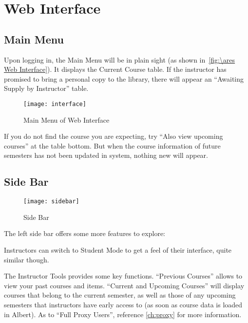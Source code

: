 \chapter{Web Interface}
\label{ch:interface}
\section{Main Menu}
\label{sec:main menu}
Upon logging in, the {\imp Main Menu} will be in plain sight (as shown in~\autoref{fig:\ares Web Interface}). It displays the Current Course table. If the instructor has promised to bring a personal copy to the library, there will appear an ``Awaiting Supply by Instructor'' table. 
\vspace*{3.5ex}

\begin{figure}[h]
    \centering
    \texttt{[image: interface]}
    \caption{Main Menu of \ares Web Interface}
    \label{fig:\ares Web Interface}
\end{figure}
\vspace*{2.5ex}

If you do not find the course you are expecting, try ``Also view upcoming courses'' at the table bottom. But when the course information of future semesters has not been updated in \ares system, nothing new will appear.

\section{Side Bar}
\label{side bar}


\begin{wrapfigure}{o}{0.25\textwidth}
    \centering
    \texttt{[image: sidebar]}
    \caption{Side Bar}
    \label{fig: side bar}
\end{wrapfigure}

The left side bar offers some more features to explore:

Instructors can switch to Student Mode to get a feel of their interface, quite similar though. 

The {\imp Instructor Tools} provides some key functions. ``Previous Courses'' allows to view your past courses and items. ``Current and Upcoming Courses''  will display courses that belong to the current semester, as well as those of any upcoming semesters that instructors have early access to (as soon as course data is loaded in Albert). As to ``Full Proxy Users'', reference \autoref{ch:proxy} for more information.
\clearpage

